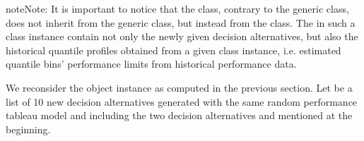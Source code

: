 \documentclass[a4paper,12pt,english]{sphinxhowto}
\begin{document}
\begin{sphinxadmonition}{note}{Note:}
It is important to notice that the  class, contrary to the generic  class, does not inherit from the generic  class, but instead from the  class. The  in such a  class instance contain not only the newly given decision alternatives, but also the historical quantile profiles obtained from a given  class instance, i.e. estimated quantile bins’ performance limits from historical performance data.
\end{sphinxadmonition}

We reconsider the  object instance  as computed in the previous section. Let  be a list of 10 new decision alternatives generated with the same random performance tableau model and including the two decision alternatives  and  mentioned at the beginning.
\end{document}
